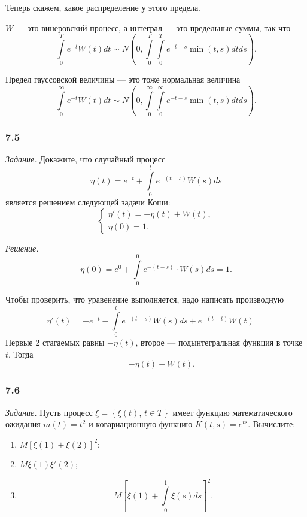 Теперь скажем, какое распределение у этого предела.

$W$ --- это винеровский процесс, а интеграл --- это предельные суммы, так что
$$ \int \limits_0^T e^{-t} W \left( t \right) dt \sim
  N \left( 0, \int \limits_0^T \int \limits_0^T e^{-t-s} \min \left( t, s \right) dtds \right).$$

Предел гауссовской величины --- это тоже нормальная величина
$$ \int \limits_0^{ \infty } e^{-t} W \left( t \right) dt \sim
  N \left(
    0, \int \limits_0^{ \infty } \int \limits_0^{ \infty } e^{-t-s} \min \left( t, s \right) dtds
  \right).$$

\subsubsection*{7.5}

\textit{Задание.}
Докажите, что случайный процесс
$$ \eta \left( t \right) =
  e^{-t} + \int \limits_0^t e^{-\left( t - s \right) } W \left( s \right) ds$$
является решением следующей задачи Коши:
$$ \begin{cases}
    \eta' \left( t \right) = -\eta \left( t \right) + W \left( t \right), \\
    \eta \left( 0 \right) = 1.
  \end{cases}$$

\textit{Решение.}
$$ \eta \left( 0 \right) =
  e^0 + \int \limits_0^0 e^{-\left( t - s \right) } \cdot W \left( s \right) ds = 1.$$

Чтобы проверить, что уравенение выполняется, надо написать производную
$$ \eta' \left( t \right) =
  -e^{-t} - \int \limits_0^t e^{-\left( t - s \right) } W \left( s \right) ds +
  e^{-\left( t - t \right) } W \left( t \right) =$$
Первые 2 стагаемых равны $-\eta \left( t \right) $, второе --- подынтегральная функция в точке $t$.
Тогда
$$= -\eta \left( t \right) + W \left( t \right).$$

\subsubsection*{7.6}

\textit{Задание.}
Пусть процесс $ \xi = \left\{ \xi \left( t \right), \, t \in T \right\} $
имеет функцию математического ожидания $m \left( t \right) = t^2$ и ковариационную функцию
$K \left( t, s \right) = e^{ts}$.
Вычислите:
\begin{enumerate}[label=\alph*)]
  \item $M \left[ \xi \left( 1 \right) + \xi \left( 2 \right) \right]^2$;
  \item $M \xi \left( 1 \right) \xi' \left( 2 \right) $;
  \item $$M \left[ \xi \left( 1 \right) + \int \limits_0^1 \xi \left( s \right) ds \right]^2.$$
\end{enumerate}


